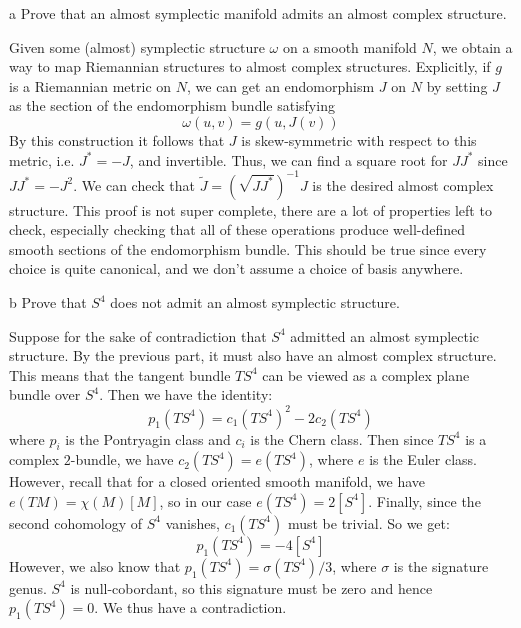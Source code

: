 \documentclass{pset}
\begin{document}
\begin{parts}
    \begin{part}{a}
        Prove that an almost symplectic manifold admits an almost complex structure.
    \end{part}

    Given some (almost) symplectic structure $\omega$ on a smooth manifold $N$, we obtain a way to map Riemannian structures to almost complex structures. 
    Explicitly, if $g$ is a Riemannian metric on $N$, we can get an endomorphism $J$ on $N$ by setting $J$ as the section of the endomorphism bundle satisfying
    \[
        \omega(u, v) = g(u,J(v))
    \]
    By this construction it follows that $J$ is skew-symmetric with respect to this metric, i.e. $J^* = -J$, and invertible. Thus, we can find a square root for $JJ^*$ since $JJ^* = -J^2$. We can check that $\tilde{J} = (\sqrt{JJ^*})^{-1}J$ is the desired almost complex structure. This proof is not super complete, there are a lot of properties left to check, especially checking that all of these operations produce well-defined smooth sections of the endomorphism bundle. This should be true since every choice is quite canonical, and we don't assume a choice of basis anywhere.

    \begin{part}{b}
        Prove that $S^4$ does not admit an almost symplectic structure. %
    \end{part}

    Suppose for the sake of contradiction that $S^4$ admitted an almost symplectic structure. By the previous part, it must also have an almost complex structure. This means that the tangent bundle $TS^4$ can be viewed as a complex plane bundle over $S^4$. Then we have the identity:
    \[
        p_1(TS^4) = c_1(TS^4)^2 - 2c_2(TS^4)
    \]
    where $p_i$ is the Pontryagin class and $c_i$ is the Chern class. Then since $TS^4$ is a complex $2$-bundle, we have $c_2(TS^4)=e(TS^4)$, where $e$ is the Euler class. However, recall that for a closed oriented smooth manifold, we have $e(TM)=\chi(M)[M]$, so in our case $e(TS^4)=2[S^4]$. Finally, since the second cohomology of $S^4$ vanishes, $c_1(TS^4)$ must be trivial. So we get:
    \[
        p_1(TS^4)=-4[S^4]
    \]
    However, we also know that $p_1(TS^4) = \sigma(TS^4) / 3$, where $\sigma$ is the signature genus. $S^4$ is null-cobordant, so this signature must be zero and hence $p_1(TS^4)=0$. We thus have a contradiction.
\end{parts}
\end{document}
